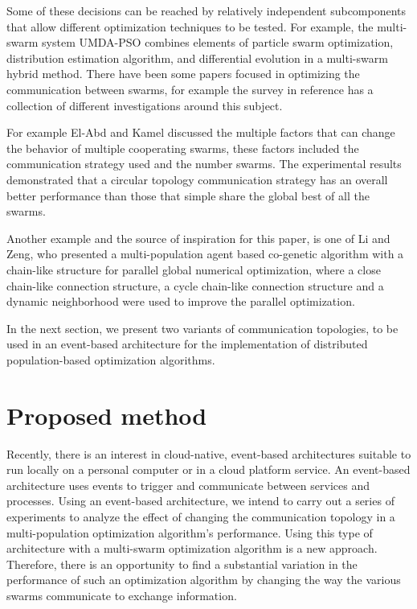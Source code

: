 \documentclass[runningheads]{llncs}
\begin{document}
Some of these decisions can be reached by relatively independent
subcomponents that allow different optimization techniques to be
tested. For example, the multi-swarm system UMDA-PSO \cite{b10}
combines elements of particle swarm optimization, distribution
estimation algorithm, and differential evolution in a multi-swarm
hybrid method. There have been some papers focused in optimizing the communication
between swarms, for example the survey in reference \cite{b15} has a
collection of different investigations around this subject.

For
example El-Abd and Kamel discussed the multiple factors that can
change the behavior of multiple cooperating swarms, these factors
included the communication strategy used and the number swarms. The
experimental results demonstrated that a circular topology
communication strategy has an overall better performance than those
that simple share the global best of all the swarms\cite{b16}. 

Another example and the source of inspiration for this paper, is one
of Li and Zeng, who presented a multi-population agent based
co-genetic algorithm with a chain-like structure for parallel global
numerical optimization, where a close chain-like connection structure,
a cycle chain-like connection structure and a dynamic neighborhood
were used to improve the parallel optimization\cite{b17}. 

In the next section, we present two variants of communication topologies,
to be used in an event-based architecture for the implementation of 
distributed population-based optimization algorithms.

\section{Proposed method}

Recently, there is an interest in cloud-native, event-based architectures
suitable to run locally on a personal computer or in a cloud platform service.
An event-based architecture uses events to trigger and communicate between
services and processes. Using an event-based architecture, we intend to carry
out a series of experiments to analyze the effect of changing the communication
topology in a multi-population optimization algorithm's performance. Using this
type of architecture with a multi-swarm optimization algorithm is a new
approach. Therefore, there is an opportunity to find a substantial variation in
the performance of such an optimization algorithm by changing the way the
various swarms communicate to exchange information.
\end{document}
